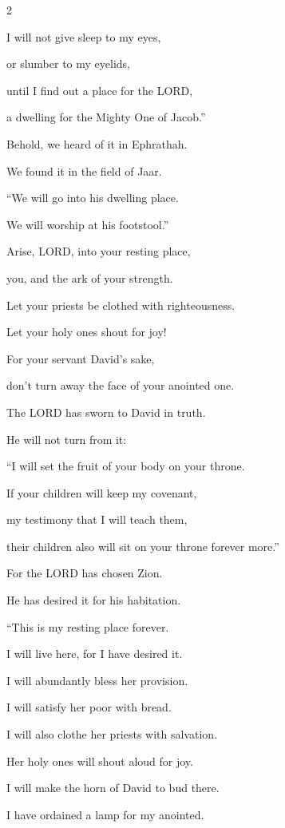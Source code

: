 \begin{multicols}{2}
	
	\myverse{}I will not give sleep to my eyes,
	
	or slumber to my eyelids,
	
	
	\myverse{}until I find out a place for the LORD,
	
	a dwelling for the Mighty One of Jacob.”
	
	
	\myverse{}Behold, we heard of it in Ephrathah.
	
	We found it in the field of Jaar.
	
	
	\myverse{}“We will go into his dwelling place.
	
	We will worship at his footstool.”
	
	
	\myverse{}Arise, LORD, into your resting place,
	
	you, and the ark of your strength.
	
	
	\myverse{}Let your priests be clothed with righteousness.
	
	Let your holy ones shout for joy!
	
	
	\myverse{}For your servant David’s sake,
	
	don’t turn away the face of your anointed one.
	
	
	\myverse{}The LORD has sworn to David in truth.
	
	He will not turn from it:
	
	“I will set the fruit of your body on your throne.
	
	
	\myverse{}If your children will keep my covenant,
	
	my testimony that I will teach them,
	
	their children also will sit on your throne forever more.”
	
	
	\myverse{}For the LORD has chosen Zion.
	
	He has desired it for his habitation.
	
	
	\myverse{}“This is my resting place forever.
	
	I will live here, for I have desired it.
	
	
	\myverse{}I will abundantly bless her provision.
	
	I will satisfy her poor with bread.
	
	
	\myverse{}I will also clothe her priests with salvation.
	
	Her holy ones will shout aloud for joy.
	
	
	\myverse{}I will make the horn of David to bud there.
	
	I have ordained a lamp for my anointed.
	

\end{multicols}
